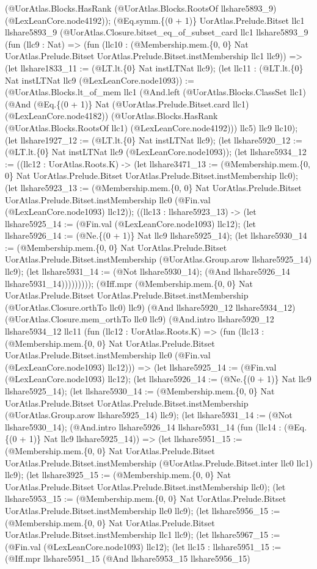 \documentclass[11pt]{article}
\begin{document}
(@UorAtlas.Blocks.HasRank (@UorAtlas.Blocks.RootsOf llshare5893\_9) (@LexLeanCore.node4192)); (@Eq.symm.\{(0 + 1)\} UorAtlas.Prelude.Bitset llc1 llshare5893\_9 (@UorAtlas.Closure.bitset\_eq\_of\_subset\_card llc1 llshare5893\_9 (fun (llc9 : Nat) => (fun (llc10 : (@Membership.mem.\{0, 0\} Nat UorAtlas.Prelude.Bitset UorAtlas.Prelude.Bitset.instMembership llc1 llc9)) => (let llshare1833\_11 := (@LT.lt.\{0\} Nat instLTNat llc9); (let llc11 : (@LT.lt.\{0\} Nat instLTNat llc9 (@LexLeanCore.node1093)) := (@UorAtlas.Blocks.lt\_of\_mem llc1 (@And.left (@UorAtlas.Blocks.ClassSet llc1) (@And (@Eq.\{(0 + 1)\} Nat (@UorAtlas.Prelude.Bitset.card llc1) (@LexLeanCore.node4182)) (@UorAtlas.Blocks.HasRank (@UorAtlas.Blocks.RootsOf llc1) (@LexLeanCore.node4192))) llc5) llc9 llc10); (let llshare1927\_12 := (@LT.lt.\{0\} Nat instLTNat llc9); (let llshare5920\_12 := (@LT.lt.\{0\} Nat instLTNat llc9 (@LexLeanCore.node1093)); (let llshare5934\_12 := ((llc12 : UorAtlas.Roots.K) -> (let llshare3471\_13 := (@Membership.mem.\{0, 0\} Nat UorAtlas.Prelude.Bitset UorAtlas.Prelude.Bitset.instMembership llc0); (let llshare5923\_13 := (@Membership.mem.\{0, 0\} Nat UorAtlas.Prelude.Bitset UorAtlas.Prelude.Bitset.instMembership llc0 (@Fin.val (@LexLeanCore.node1093) llc12)); ((llc13 : llshare5923\_13) -> (let llshare5925\_14 := (@Fin.val (@LexLeanCore.node1093) llc12); (let llshare5926\_14 := (@Ne.\{(0 + 1)\} Nat llc9 llshare5925\_14); (let llshare5930\_14 := (@Membership.mem.\{0, 0\} Nat UorAtlas.Prelude.Bitset UorAtlas.Prelude.Bitset.instMembership (@UorAtlas.Group.arow llshare5925\_14) llc9); (let llshare5931\_14 := (@Not llshare5930\_14); (@And llshare5926\_14 llshare5931\_14))))))))); (@Iff.mpr (@Membership.mem.\{0, 0\} Nat UorAtlas.Prelude.Bitset UorAtlas.Prelude.Bitset.instMembership (@UorAtlas.Closure.orthTo llc0) llc9) (@And llshare5920\_12 llshare5934\_12) (@UorAtlas.Closure.mem\_orthTo llc0 llc9) (@And.intro llshare5920\_12 llshare5934\_12 llc11 (fun (llc12 : UorAtlas.Roots.K) => (fun (llc13 : (@Membership.mem.\{0, 0\} Nat UorAtlas.Prelude.Bitset UorAtlas.Prelude.Bitset.instMembership llc0 (@Fin.val (@LexLeanCore.node1093) llc12))) => (let llshare5925\_14 := (@Fin.val (@LexLeanCore.node1093) llc12); (let llshare5926\_14 := (@Ne.\{(0 + 1)\} Nat llc9 llshare5925\_14); (let llshare5930\_14 := (@Membership.mem.\{0, 0\} Nat UorAtlas.Prelude.Bitset UorAtlas.Prelude.Bitset.instMembership (@UorAtlas.Group.arow llshare5925\_14) llc9); (let llshare5931\_14 := (@Not llshare5930\_14); (@And.intro llshare5926\_14 llshare5931\_14 (fun (llc14 : (@Eq.\{(0 + 1)\} Nat llc9 llshare5925\_14)) => (let llshare5951\_15 := (@Membership.mem.\{0, 0\} Nat UorAtlas.Prelude.Bitset UorAtlas.Prelude.Bitset.instMembership (@UorAtlas.Prelude.Bitset.inter llc0 llc1) llc9); (let llshare3925\_15 := (@Membership.mem.\{0, 0\} Nat UorAtlas.Prelude.Bitset UorAtlas.Prelude.Bitset.instMembership llc0); (let llshare5953\_15 := (@Membership.mem.\{0, 0\} Nat UorAtlas.Prelude.Bitset UorAtlas.Prelude.Bitset.instMembership llc0 llc9); (let llshare5956\_15 := (@Membership.mem.\{0, 0\} Nat UorAtlas.Prelude.Bitset UorAtlas.Prelude.Bitset.instMembership llc1 llc9); (let llshare5967\_15 := (@Fin.val (@LexLeanCore.node1093) llc12); (let llc15 : llshare5951\_15 := (@Iff.mpr llshare5951\_15 (@And llshare5953\_15 llshare5956\_15) 
\end{document}
